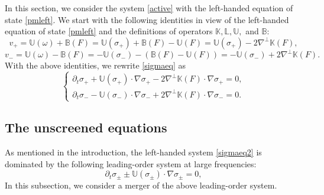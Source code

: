 \documentclass[11pt,reqno]{amsproc}
\newcommand{\pa}{\partial}
\newcommand{\na}{\nabla}
\newcommand{\B}{\mathbb{B}}
\newcommand{\U}{\mathbb{U}}
\begin{document}
In this section, we consider the system \eqref{active} with the left-handed equation of state \eqref{pmleft}. We start with the following identities in view of the left-handed equation of state \eqref{pmleft} and the definitions of operators $\mathbb{K}, \mathbb{L}, \mathbb{U},$ and $\mathbb{B}$:
$$
v_+ = \U(\omega) + \B(F) = \U(\sigma_+) + \B(F) - \U(F) = \U(\sigma_+) - 2\na^\perp \mathbb{K}(F),
$$
$$
v_- = \U(\omega) - \B(F) = -\U(\sigma_-) - (\B(F) - \U(F)) = -\U(\sigma_-) + 2\na^\perp \mathbb{K}(F).
$$
With the above identities, we rewrite \eqref{sigmaeq} as
\begin{equation}
    \label{sigmaeq2}
    \begin{cases}
    \pa_t \sigma_+ + \U(\sigma_+) \cdot \nabla \sigma_+ -2\na^\perp \mathbb{K}(F)\cdot \nabla \sigma_+ = 0,\\
    \pa_t \sigma_- - \U(\sigma_-) \cdot \nabla \sigma_- +2\na^\perp \mathbb{K}(F)\cdot \nabla \sigma_- = 0.
    \end{cases}
\end{equation}


\subsection{The unscreened equations} \label{subsect:lefthandedunscreen}
As mentioned in the introduction, the left-handed system \eqref{sigmaeq2} is dominated by the following leading-order system at large frequencies:
\begin{equation}
    \label{reducedeq}
    \pa_t \sigma_\pm \pm \U(\sigma_\pm)\cdot \nabla \sigma_\pm = 0,
\end{equation}
In this subsection, we consider a merger of the above leading-order system.
\end{document}
